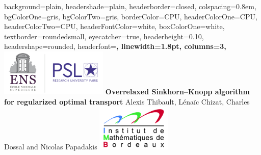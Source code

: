 \documentclass[landscape,a0paper,fontscale=0.35]{baposter} %
\theoremstyle{plain}
\theoremstyle{plain}
\theoremstyle{plain}
\theoremstyle{plain}
\begin{document}
\begin{poster}
{
background=plain,
headershade=plain,
headerborder=closed, %
colspacing=0.8em, %
bgColorOne=gris, %
bgColorTwo=gris, %
borderColor=CPU, %
headerColorOne=CPU, %
headerColorTwo=CPU, %
headerFontColor=white, %
boxColorOne=white, %
textborder=roundedsmall, %
eyecatcher=true, %
headerheight=0.10\textheight, %
headershape=rounded, %
headerfont=\Large\bf\textsc, %
linewidth=1.8pt, %
columns=3,
}
%
{\includegraphics[height=6em]{logo_ens_psl.png}} %
{\bf Overrelaxed Sinkhorn--Knopp algorithm\\ for regularized optimal transport\vspace{0.2em}} 
{{Alexis Thibault, L\'enaïc Chizat, Charles Dossal and  Nicolas Papadakis}} %
{\includegraphics[height=6em]{logo_imb.png}} %


\end{poster}
\end{document}
